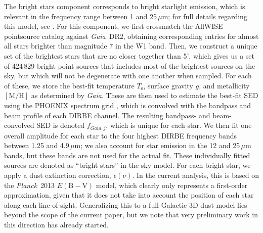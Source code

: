 \documentclass{aa}
\def\Planck{\textit{Planck}}
\def\GAIA{\textit{Gaia}}
\def\Gaia{\textit{Gaia}}
\begin{document}
The {bright stars} component corresponds to {bright} starlight emission, which
is relevant in the frequency range between 1 and 25\,$\mu$m; for full
details regarding this model, see \citet{CG02_04}. For {this component}, we first {crossmatch the AllWISE pointsource catalog \citep{CatWISE} against \Gaia\ DR2, obtaining corresponding entries for almost all stars brighter than magnitude 7 in the W1 band. Then, we construct a unique set of the brightest stars that are no closer together than 5', which gives us a set of 424\,829 bright point sources that includes most of the brightest sources on the sky, but which will not be degenerate with one another when sampled.} For each of these, we store the best-fit
temperature $T_\mathrm{s}$, surface gravity $g$, and metallicity
$[\mathrm{M}/\mathrm{H}]$ as determined by \GAIA. These are then used
to estimate the best-fit SED using the PHOENIX spectrum grid
\citep{husser:2013}, which is convolved with the bandpass and beam
profile of each DIRBE channel. The resulting bandpass- and
beam-convolved SED is denoted $f_{\GAIA,j}$, which is unique for each
star. We then fit one overall amplitude for each star to the four
highest DIRBE frequency bands between 1.25 and 4.9\,$\mu$m; we also
account for star emission in the 12 and 25\,$\mu$m bands, but these
bands are not used for the actual fit. {These individually fitted sources are denoted as ``bright
stars'' in the sky model. For each bright star, we apply a dust extinction correction, $\epsilon(\nu)$. In the current analysis, this is based on the \Planck\ 2013 $E(\mathrm{B}-\mathrm{V})$ model, which clearly only represents a first-order approximation, given that it does not take into account the position of each star along each line-of-sight. Generalizing this to a full Galactic 3D dust model lies beyond the scope of the current paper, but we note that very preliminary work in this direction has already started.}


\end{document}
